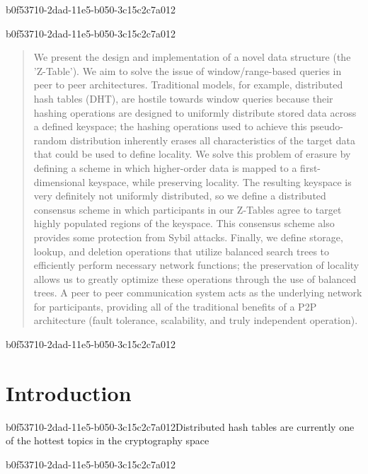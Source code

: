 \documentclass[12pt]{article}
\begin{document}
b0f53710-2dad-11e5-b050-3c15c2c7a012\maketitle

b0f53710-2dad-11e5-b050-3c15c2c7a012\begin{abstract}
We present the design and implementation of a novel data structure (the 'Z-Table'). We aim to solve the issue of window/range-based queries in peer to peer architectures. Traditional models, for example,  distributed hash tables (DHT), are hostile towards window queries because their hashing operations are designed to uniformly distribute stored data across a defined keyspace; the hashing operations used to achieve this pseudo-random distribution inherently erases all characteristics of the target data that could be used to define locality. We solve this problem of erasure by defining a scheme in which higher-order data is mapped to a first-dimensional keyspace, while preserving locality. The resulting keyspace is very definitely not uniformly distributed, so we define a distributed consensus scheme in which participants in our Z-Tables agree to target highly populated regions of the keyspace. This consensus scheme also provides some protection from Sybil attacks. Finally, we define storage, lookup, and deletion operations that utilize balanced search trees to efficiently perform necessary network functions; the preservation of locality allows us to greatly optimize these operations through the use of balanced trees. A peer to peer communication system acts as the underlying network for participants, providing all of the traditional benefits of a P2P architecture (fault tolerance, scalability, and truly independent operation).
\end{abstract}


\newpage
b0f53710-2dad-11e5-b050-3c15c2c7a012\section{Introduction}
b0f53710-2dad-11e5-b050-3c15c2c7a012Distributed hash tables are currently one of the hottest topics in the cryptography space~\cite{Stoica:2001dj,Rowstron:2001ea,Ratnasamy:2001wn}

b0f53710-2dad-11e5-b050-3c15c2c7a012\printbibliography
\end{document}
